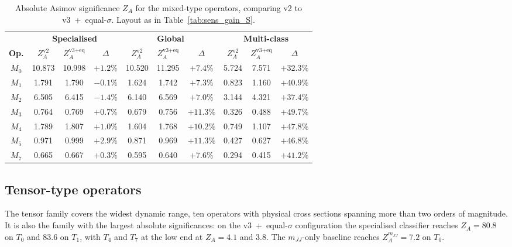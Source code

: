 \begin{table}[htbp]
  \centering
  \caption{Absolute Asimov significance $Z_A$ for the mixed-type operators, comparing v2 to v3~+~equal-$\sigma$. Layout as in Table~\ref{tab:sens_gain_S}.}
  \label{tab:sens_gain_M}
  \begin{tabular}{|c|cc|c|cc|c|cc|c|}
    \hline
    & \multicolumn{3}{c|}{\textbf{Specialised}} & \multicolumn{3}{c|}{\textbf{Global}} & \multicolumn{3}{c|}{\textbf{Multi-class}} \\
    \textbf{Op.} & $Z_A^\text{v2}$ & $Z_A^\text{v3+eq}$ & $\Delta$ & $Z_A^\text{v2}$ & $Z_A^\text{v3+eq}$ & $\Delta$ & $Z_A^\text{v2}$ & $Z_A^\text{v3+eq}$ & $\Delta$ \\
    \hline
    $M_0$ & 10.873 & 10.998 & $+1.2\%$  & 10.520 & 11.295 & $+7.4\%$  &  5.724 &  7.571 & $+32.3\%$ \\
    $M_1$ &  1.791 &  1.790 & $-0.1\%$  &  1.624 &  1.742 & $+7.3\%$  &  0.823 &  1.160 & $+40.9\%$ \\
    $M_2$ &  6.505 &  6.415 & $-1.4\%$  &  6.140 &  6.569 & $+7.0\%$  &  3.144 &  4.321 & $+37.4\%$ \\
    $M_3$ &  0.764 &  0.769 & $+0.7\%$  &  0.679 &  0.756 & $+11.3\%$ &  0.326 &  0.488 & $+49.7\%$ \\
    $M_4$ &  1.789 &  1.807 & $+1.0\%$  &  1.604 &  1.768 & $+10.2\%$ &  0.749 &  1.107 & $+47.8\%$ \\
    $M_5$ &  0.971 &  0.999 & $+2.9\%$  &  0.871 &  0.969 & $+11.3\%$ &  0.427 &  0.627 & $+46.8\%$ \\
    $M_7$ &  0.665 &  0.667 & $+0.3\%$  &  0.595 &  0.640 & $+7.6\%$  &  0.294 &  0.415 & $+41.2\%$ \\
    \hline
  \end{tabular}
\end{table}

\subsection{Tensor-type operators}
\label{sec:sens_tensor}

The tensor family covers the widest dynamic range, ten operators with physical cross sections spanning more than two orders of magnitude. It is also the family with the largest absolute significances: on the v3~+~equal-$\sigma$ configuration the specialised classifier reaches $Z_A=80.8$ on $T_0$ and $83.6$ on $T_1$, with $T_4$ and $T_7$ at the low end at $Z_A=4.1$ and $3.8$. The $m_{JJ}$-only baseline reaches $Z_A^{m_{JJ}}=7.2$ on $T_0$.

